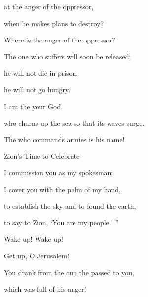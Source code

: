 {\par }{\Q at the anger
of the oppressor,
\par }{\Q when he makes
plans to destroy?
\par }{\Q Where
is the anger
of the oppressor?
\par }{\Q {}The one who suffers
will soon
be released;
\par }{\Q he will not
die
in prison,
\par }{\Q he will not
go hungry.
\par }{\Q {}I
am the
{}
your God,
\par }{\Q who churns
up the sea
so that its waves
surge.
\par }{\Q The
{}
who commands armies
is his name!
\par }{\SH Zion’s Time to Celebrate
\par }{\Q {}I commission
you as my spokesman;
\par }{\Q I cover
you with the palm
of my hand,
\par }{\Q to establish
the sky
and to found
the earth,
\par }{\Q to say
to Zion,
‘You
are my people.’ ”
\par }{\Q {}Wake
up! Wake
up!
\par }{\Q Get
up, O Jerusalem!
\par }{\Q You drank
from
the cup
the {}
passed to you,
\par }{\Q which was full of his anger!

}
